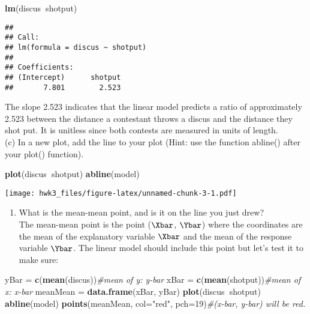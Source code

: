 \documentclass[
]{article}
\newenvironment{Shaded}{\begin{snugshade}}{\end{snugshade}}
\newcommand{\CommentTok}[1]{\textcolor[rgb]{0.56,0.35,0.01}{\textit{#1}}}
\newcommand{\DataTypeTok}[1]{\textcolor[rgb]{0.13,0.29,0.53}{#1}}
\newcommand{\DecValTok}[1]{\textcolor[rgb]{0.00,0.00,0.81}{#1}}
\newcommand{\KeywordTok}[1]{\textcolor[rgb]{0.13,0.29,0.53}{\textbf{#1}}}
\newcommand{\NormalTok}[1]{#1}
\newcommand{\OperatorTok}[1]{\textcolor[rgb]{0.81,0.36,0.00}{\textbf{#1}}}
\newcommand{\StringTok}[1]{\textcolor[rgb]{0.31,0.60,0.02}{#1}}
\providecommand{\tightlist}{%
  \setlength{\itemsep}{0pt}\setlength{\parskip}{0pt}}
\begin{document}
\begin{Shaded}
\begin{Highlighting}[]
\KeywordTok{lm}\NormalTok{(discus}\OperatorTok{~}\NormalTok{shotput)}
\end{Highlighting}
\end{Shaded}

\begin{verbatim}
## 
## Call:
## lm(formula = discus ~ shotput)
## 
## Coefficients:
## (Intercept)      shotput  
##       7.801        2.523
\end{verbatim}

The slope 2.523 indicates that the linear model predicts a ratio of
approximately 2.523 between the distance a contestant throws a discus
and the distance they shot put. It is unitless since both contests are
measured in units of length.\\
(c) In a new plot, add the line to your plot (Hint: use the function
abline() after your plot() function).

\begin{Shaded}
\begin{Highlighting}[]
\KeywordTok{plot}\NormalTok{(discus}\OperatorTok{~}\NormalTok{shotput)}
\KeywordTok{abline}\NormalTok{(model)}
\end{Highlighting}
\end{Shaded}

\texttt{[image: hwk3\_files/figure-latex/unnamed-chunk-3-1.pdf]}

\begin{enumerate}
\def\labelenumi{(\alph{enumi})}
\setcounter{enumi}{3}
\tightlist
\item
  What is the mean-mean point, and is it on the line you just drew?\\
  The mean-mean point is the point (\(\Xbar\), \(\Ybar\)) where the
  coordinates are the mean of the explanatory variable \(\Xbar\) and the
  mean of the response variable \(\Ybar\). The linear model should
  include this point but let's test it to make sure:
\end{enumerate}

\begin{Shaded}
\begin{Highlighting}[]
\NormalTok{yBar =}\StringTok{ }\KeywordTok{c}\NormalTok{(}\KeywordTok{mean}\NormalTok{(discus))}\CommentTok{#mean of y: y-bar}
\NormalTok{xBar =}\StringTok{ }\KeywordTok{c}\NormalTok{(}\KeywordTok{mean}\NormalTok{(shotput))}\CommentTok{#mean of x: x-bar}
\NormalTok{meanMean =}\StringTok{ }\KeywordTok{data.frame}\NormalTok{(xBar, yBar)}
\KeywordTok{plot}\NormalTok{(discus}\OperatorTok{~}\NormalTok{shotput)}
\KeywordTok{abline}\NormalTok{(model)}
\KeywordTok{points}\NormalTok{(meanMean, }\DataTypeTok{col=}\StringTok{"red"}\NormalTok{, }\DataTypeTok{pch=}\DecValTok{19}\NormalTok{)}\CommentTok{#(x-bar, y-bar) will be red.}
\end{Highlighting}
\end{Shaded}
\end{document}
